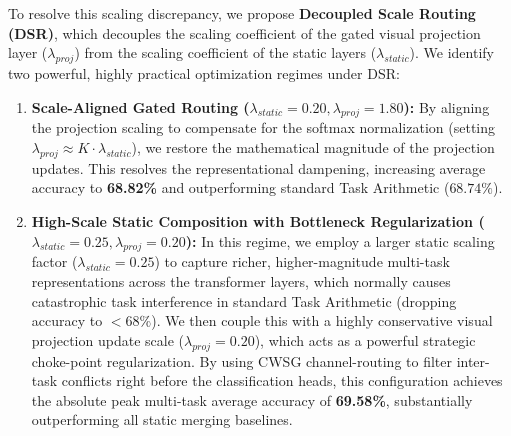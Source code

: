 To resolve this scaling discrepancy, we propose \textbf{Decoupled Scale Routing (DSR)}, which decouples the scaling coefficient of the gated visual projection layer ($\lambda_{proj}$) from the scaling coefficient of the static layers ($\lambda_{static}$). We identify two powerful, highly practical optimization regimes under DSR:
\begin{enumerate}
    \item \textbf{Scale-Aligned Gated Routing ($\lambda_{static} = 0.20, \lambda_{proj} = 1.80$):} By aligning the projection scaling to compensate for the softmax normalization (setting $\lambda_{proj} \approx K \cdot \lambda_{static}$), we restore the mathematical magnitude of the projection updates. This resolves the representational dampening, increasing average accuracy to \textbf{68.82\%} and outperforming standard Task Arithmetic ($68.74\%$).
    \item \textbf{High-Scale Static Composition with Bottleneck Regularization ($\lambda_{static} = 0.25, \lambda_{proj} = 0.20$):} In this regime, we employ a larger static scaling factor ($\lambda_{static} = 0.25$) to capture richer, higher-magnitude multi-task representations across the transformer layers, which normally causes catastrophic task interference in standard Task Arithmetic (dropping accuracy to $<68\%$). We then couple this with a highly conservative visual projection update scale ($\lambda_{proj} = 0.20$), which acts as a powerful strategic choke-point regularization. By using CWSG channel-routing to filter inter-task conflicts right before the classification heads, this configuration achieves the absolute peak multi-task average accuracy of \textbf{69.58\%}, substantially outperforming all static merging baselines.
\end{enumerate}

